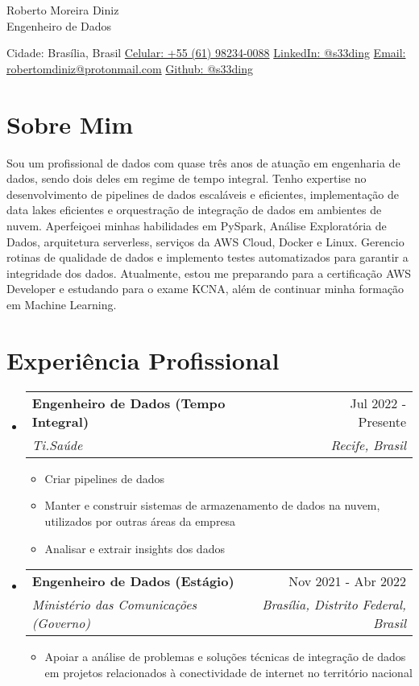 \documentclass[letterpaper,11pt]{article}%
\makeatletter
\newcommand{\resumeItem}[1]{\item{#1 \vspace{-3pt}}}%
\newcommand{\resumeSubheading}[4]{\vspace{-1pt}\item\begin{tabular*}{0.97\textwidth}[t]{l@{\extracolsep{\fill}}r}\textbf{#1} & #2 \\\textit{\small #3} & \textit{\small #4} \\\end{tabular*}\vspace{-8pt}}%
\newcommand{\resumeSubHeadingListStart}{\begin{itemize}[leftmargin=0.15in, label={}, itemsep=0pt, parsep=0pt]}%
\newcommand{\resumeSubHeadingListEnd}{\end{itemize}}%
\newcommand{\resumeItemListStart}{\begin{itemize}[itemsep=0pt, parsep=0pt]}%
\newcommand{\resumeItemListEnd}{\end{itemize}\vspace{-1pt}}%
\makeatother
\begin{document}
%
\normalsize%
\section*{}%
\label{sec:}%
\begin{center}%
{\LARGE Roberto Moreira Diniz} \\ \vspace{5pt}%
{\large Engenheiro de Dados} \\ \vspace{5pt}%
\end{center}%
\begin{center}%
Cidade: Brasília, Brasil \quad \textbullet \quad \href{https://wa.me/qr/UYOUX2DZ7BYHI1}{Celular: +55 (61) 98234-0088} \quad \textbullet \quad \href{https://www.linkedin.com/in/s33ding/}{LinkedIn: @s33ding} \quad \textbullet \quad \href{mailto:robertomdiniz@protonmail.com}{Email: robertomdiniz@protonmail.com} \quad \textbullet \quad \href{https://github.com/s33ding}{Github: @s33ding}%
\end{center}

%
\section*{Sobre Mim}%
\label{sec:SobreMim}%
Sou um profissional de dados com quase três anos de atuação em engenharia de dados, sendo dois deles em regime de tempo integral. Tenho expertise no desenvolvimento de pipelines de dados escaláveis e eficientes, implementação de data lakes eficientes e orquestração de integração de dados em ambientes de nuvem. Aperfeiçoei minhas habilidades em PySpark, Análise Exploratória de Dados, arquitetura serverless, serviços da AWS Cloud, Docker e Linux. Gerencio rotinas de qualidade de dados e implemento testes automatizados para garantir a integridade dos dados. Atualmente, estou me preparando para a certificação AWS Developer e estudando para o exame KCNA, além de continuar minha formação em Machine Learning.

%
\section*{Experiência Profissional}%
\label{sec:ExperinciaProfissional}%
\resumeSubHeadingListStart%
\resumeSubheading{Engenheiro de Dados (Tempo Integral)}{Jul 2022 - Presente}{Ti.Saúde}{Recife, Brasil}%
\resumeItemListStart%
\resumeItem{Criar pipelines de dados}%
\resumeItem{Manter e construir sistemas de armazenamento de dados na nuvem, utilizados por outras áreas da empresa}%
\resumeItem{Analisar e extrair insights dos dados}%
\resumeItemListEnd%
\resumeSubheading{Engenheiro de Dados (Estágio)}{Nov 2021 - Abr 2022}{Ministério das Comunicações (Governo)}{Brasília, Distrito Federal, Brasil}%
\resumeItemListStart%
\resumeItem{Apoiar a análise de problemas e soluções técnicas de integração de dados em projetos relacionados à conectividade de internet no território nacional}%
\resumeItemListEnd%
\resumeSubHeadingListEnd
\end{document}

